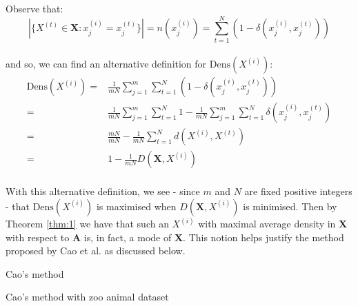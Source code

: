 \noindent Observe that:
\[
	|\{X^{(t)} \in \textbf{X} : x_j^{(i)} = x_j^{(t)}\}| = n(x_j^{(i)}) = 
	\sum_{t=1}^N (1 - \delta(x_j^{(i)}, x_j^{(t)}))
\]\\

and so, we can find an alternative definition for \(\text{Dens}(X^{(i)})\):
\begin{equation}
\begin{aligned}
    \text{Dens}(X^{(i)}) = {} & {} \frac{1}{mN} \sum_{j=1}^m \sum_{t=1}^N 
                         (1 - \delta(x_j^{(i)}, x_j^{(t)}))
    \\
			             = {} & {} \frac{1}{mN} \sum_{j=1}^m \sum_{t=1}^N 1 - 
                         \frac{1}{mN} \sum_{j=1}^m \sum_{t=1}^N 
                         \delta(x_j^{(i)}, x_j^{(t)})
    \\
                         = {} & {} \frac{mN}{mN} - \frac{1}{mN} \sum_{t=1}^N 
                         d(X^{(i)}, X^{(t)})
    \\
			             = {} & {} 1 - \frac{1}{mN} D(\textbf{X}, X^{(i)})
\end{aligned}
\end{equation}\\

With this alternative definition, we see - since \(m\) and \(N\) are fixed 
positive integers - that \(\text{Dens}(X^{(i)})\) is maximised when 
\(D(\textbf{X}, X^{(i)})\) is minimised. Then by Theorem \ref{thm:1} we have
that such an \(X^{(i)}\) with maximal average density in \textbf{X} with respect
to \textbf{A} is, in fact, a mode of \textbf{X}. This notion helps justify the 
method proposed by Cao et al. as discussed below.\\

\begin{algorithm}[H]
\caption{Cao's method}\label{alg:cao}
	\begin{algorithmic}[0]
        \State{\(\bar{\mu} \gets \emptyset\)}
		\EndFor
		\EndWhile
	\end{algorithmic}
\end{algorithm}

\begin{example}\label{ex:cao}
    Cao's method with zoo animal dataset
\end{example}

